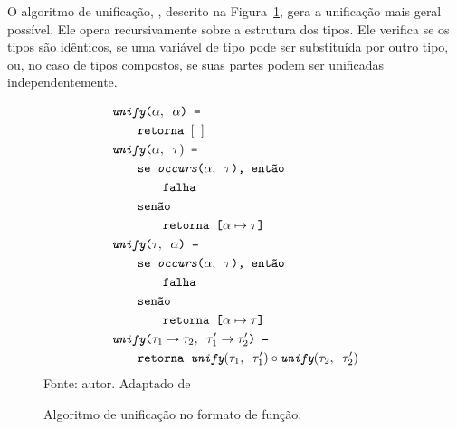 O algoritmo de unificação, \Unify, descrito na Figura~\ref{algo:unify}, gera a unificação mais geral possível.
Ele opera recursivamente sobre a estrutura dos tipos.
Ele verifica se os tipos são idênticos, se uma variável de tipo pode ser substituída por outro tipo, ou, no caso de tipos compostos, se suas partes podem ser unificadas independentemente.

\begin{figure}[ht!]
  \caption{Algoritmo de unificação no formato de função.}
  \centering
  \begin{align*}
     & \texttt{\Unify($\alpha, \Whitespace \alpha$) = }                                                                     \\
     & \qquad{}\texttt{\Return \Whitespace $[\Whitespace]$}                                                                 \\
     & \texttt{\Unify($\alpha, \Whitespace \tau)$ = }                                                                       \\
     & \qquad{}\texttt{\If \Whitespace \Occurs($\alpha, \Whitespace \tau$), \Then}                                          \\
     & \qquad{}\qquad{}\texttt{\Fail}                                                                                       \\
     & \qquad{}\texttt{\Else}                                                                                               \\
     & \qquad{}\qquad{}\texttt{\Return \Whitespace [$\alpha\mapsto\tau$]}                                                   \\
     & \texttt{\Unify($\tau, \Whitespace \alpha$) = }                                                                       \\
     & \qquad{}\texttt{\If \Whitespace \Occurs($\alpha, \Whitespace \tau$), \Then}                                          \\
     & \qquad{}\qquad{}\texttt{\Fail}                                                                                       \\
     & \qquad{}\texttt{\Else}                                                                                               \\
     & \qquad{}\qquad{}\texttt{\Return \Whitespace [$\alpha\mapsto\tau$]}                                                   \\
     & \texttt{\Unify($\tau_1 \to \tau_2, \Whitespace \tau_1' \to \tau_2'$) = }                                             \\
     & \qquad{}\texttt{\Return \Whitespace $\Unify(\tau_1, \Whitespace \tau_1') \circ \Unify(\tau_2, \Whitespace \tau_2')$}
  \end{align*}
  \small{Fonte: autor. Adaptado de~\cite{RIBEIRO2016}}\label{algo:unify}
\end{figure}

